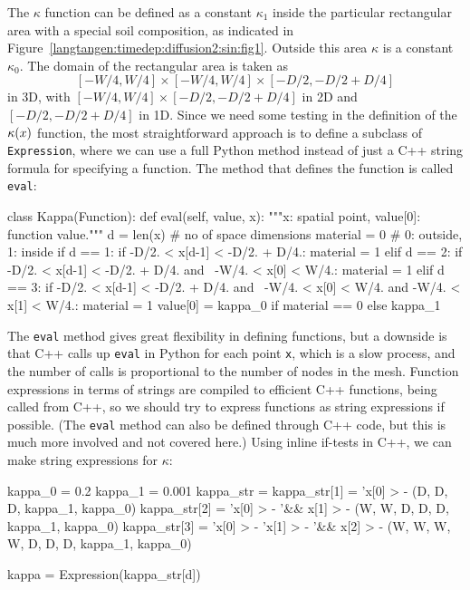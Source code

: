 The $\kappa$ function can be defined as a constant $\kappa_1$ inside
the particular rectangular area with a special soil composition, as
indicated in Figure~\ref{langtangen:timedep:diffusion2:sin:fig1}. Outside
this area $\kappa$ is a constant $\kappa_0$.
The domain of the rectangular area is taken as 
\[ [-W/4, W/4]\times [-W/4, W/4]\times [-D/2, -D/2 + D/4]\]
in 3D, with $[-W/4, W/4]\times [-D/2, -D/2 + D/4]$ in 2D and
$[-D/2, -D/2 + D/4]$ in 1D.
Since we need some testing in the definition of the $\kappa({x})$
function, the most straightforward approach is to define a subclass
of {\fontsize{10pt}{10pt}\texttt{Expression}}, where we can use a full Python method instead of
just a C++ string formula for specifying a function.
The method that defines the function is called {\fontsize{10pt}{10pt}\texttt{eval}}:
\begin{python}
class Kappa(Function):
    def eval(self, value, x):
        """x: spatial point, value[0]: function value."""
        d = len(x)  # no of space dimensions
        material = 0  # 0: outside, 1: inside
        if d == 1:
            if -D/2. < x[d-1] < -D/2. + D/4.:
                material = 1
        elif d == 2:
            if -D/2. < x[d-1] < -D/2. + D/4. and \
               -W/4. < x[0] < W/4.:
                material = 1
        elif d == 3:
            if -D/2. < x[d-1] < -D/2. + D/4. and \
               -W/4. < x[0] < W/4. and -W/4. < x[1] < W/4.:
                material = 1
        value[0] = kappa_0 if material == 0 else kappa_1
\end{python}
The {\fontsize{10pt}{10pt}\texttt{eval}} method gives great flexibility in defining functions,
but a downside is that C++ calls up {\fontsize{10pt}{10pt}\texttt{eval}} in Python for 
each point {\fontsize{10pt}{10pt}\texttt{x}}, which is a slow process, and the number of calls
is proportional to the number of nodes in the mesh.
Function expressions in terms of strings are compiled to efficient
C++ functions, being called from C++, so we should try to express functions
as string expressions if possible. (The {\fontsize{10pt}{10pt}\texttt{eval}} method can also be
defined through C++ code, but this is much
more involved and not covered here.)
Using inline if-tests in C++, we can make string expressions for
$\kappa$:
\begin{python}
kappa_0 = 0.2
kappa_1 = 0.001
kappa_str = {}
kappa_str[1] = 'x[0] > -%
               (D, D, D, kappa_1, kappa_0)
kappa_str[2] = 'x[0] > -%
            '&& x[1] > -%
               (W, W, D, D, D, kappa_1, kappa_0)
kappa_str[3] = 'x[0] > -%
               'x[1] > -%
            '&& x[2] > -%
               (W, W, W, W, D, D, D, kappa_1, kappa_0)

kappa = Expression(kappa_str[d])
\end{python}
